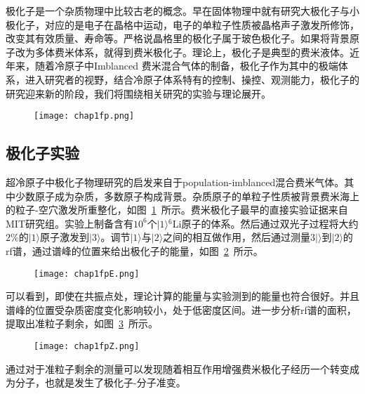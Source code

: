 极化子是一个杂质物理中比较古老的概念。早在固体物理中就有研究大极化子与小极化子\cite{landau1933bewegung,pekar1946autolocalization,frohlich1950xx,frohlich1954electrons,feynman1955slow,mahanmany}，对应的是电子在晶格中运动，电子的单粒子性质被晶格声子激发所修饰，改变其有效质量、寿命等。严格说晶格里的极化子属于玻色极化子。如果将背景原子改为多体费米体系，就得到费米极化子。理论上，极化子是典型的费米液体。近年来，随着冷原子中Imblanced 费米混合气体的制备，极化子作为其中的极端体系，进入研究者的视野，结合冷原子体系特有的控制、操控、观测能力，极化子的研究迎来新的阶段，我们将围绕相关研究的实验与理论展开。
\begin{figure}[!htbp]
    \centering
    \texttt{[image: chap1fp.png]}
    \label{fp}
\end{figure}

\subsection{极化子实验}
超冷原子中极化子物理研究的启发来自于population-imblanced混合费米气体。其中少数原子成为杂质，多数原子构成背景。杂质原子的单粒子性质被背景费米海上的粒子-空穴激发所重整化，如图~\ref{fp}~所示。费米极化子最早的直接实验证据来自MIT研究组\cite{Schirotzekobservation}。实验上制备含有$10^6$个$|1\rangle{}^6$Li原子的体系。然后通过双光子过程将大约$2\%$的$|1\rangle$原子激发到$|3\rangle$。调节$|1\rangle$与$|2\rangle$之间的相互做作用，然后通过测量$3|\rangle$到$|2\rangle$的rf谱，通过谱峰的位置来给出极化子的能量，如图~\ref{fpE}~所示。
\begin{figure}[!htbp]
    \centering
    \texttt{[image: chap1fpE.png]}
    \label{fpE}
\end{figure}

可以看到，即使在共振点处，理论计算的能量与实验测到的能量也符合很好。并且谱峰的位置受杂质密度变化影响较小，处于低密度区间。进一步分析rf谱的面积，提取出准粒子剩余，如图~\ref{fpZ}~所示。
\begin{figure}[!htbp]
    \centering
    \texttt{[image: chap1fpZ.png]}
    \label{fpZ}
\end{figure}
通过对于准粒子剩余的测量可以发现随着相互作用增强费米极化子经历一个转变成为分子，也就是发生了极化子-分子准变。

